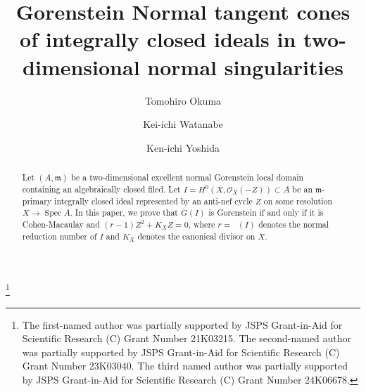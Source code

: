\documentclass[12pt]{amsart}
\theoremstyle{definition}
\theoremstyle{remark}
\numberwithin{equation}{section}
\DeclareMathOperator{\Spec}{Spec}
\DeclareMathOperator{\br}{\bar r}
\newcommand{\m}{\mathfrak m}
\renewcommand{\:}{\colon}
\begin{document}
\title{Gorenstein Normal tangent cones of integrally closed ideals in two-dimensional normal singularities
}

\author{Tomohiro Okuma}
\address[Tomohiro Okuma]{Department of Mathematical Sciences, 
Yamagata University,  Yamagata, 990-8560, Japan.}
\author{Kei-ichi Watanabe}
\address[Kei-ichi Watanabe]{Department of Mathematics, College of Humanities and Sciences, 
Nihon University, Setagaya-ku, Tokyo, 156-8550, Japan and 
Organization for the Strategic Coordination of Research and Intellectual Properties, Meiji University
}
\author{Ken-ichi Yoshida}
\address[Ken-ichi Yoshida]{Department of Mathematics, 
College of Humanities and Sciences, 
Nihon University, Setagaya-ku, Tokyo, 156-8550, Japan}

\thanks{The first-named author was partially supported by JSPS Grant-in-Aid for Scientific Research (C) Grant Number 21K03215. 
The second-named author was partially supported by JSPS Grant-in-Aid for Scientific Research (C) Grant Number 23K03040. 
The third named author was partially supported by JSPS Grant-in-Aid for Scientific Research (C) Grant Number 24K06678.}


\pagestyle{plain}


\begin{abstract} 
Let $(A,\m)$ be a two-dimensional excellent normal Gorenstein 
local domain containing an algebraically closed filed. 
Let $I =H^0(X,\mathcal{O}_X(-Z)) \subset A$ be 
an $\m$-primary integrally closed ideal represented by an anti-nef cycle $Z$ 
on some resolution $X\to \Spec A$. 
In this paper, we prove that $\overline{G}(I)$ is Gorenstein if and only if 
it is Cohen-Macaulay and $(r-1)Z^2+K_XZ=0$, where 
$r=\br(I)$ denotes the normal reduction number of $I$ and 
$K_X$ denotes the canonical divisor on $X$. 
\end{abstract}
\end{document}
